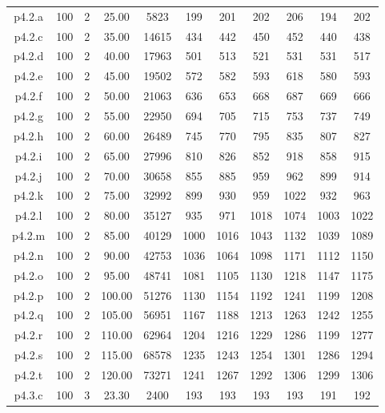 \begin{center}
\begin{tabular}{ |c|c|c|c|c|c|c|c|c|c|c| }
p4.2.a & 100 & 2 & 25.00 & 5823 & 199 & 201 & 202 & 206 & 194 & 202  \\
p4.2.c & 100 & 2 & 35.00 & 14615 & 434 & 442 & 450 & 452 & 440 & 438  \\
p4.2.d & 100 & 2 & 40.00 & 17963 & 501 & 513 & 521 & 531 & 531 & 517  \\
p4.2.e & 100 & 2 & 45.00 & 19502 & 572 & 582 & 593 & 618 & 580 & 593  \\
p4.2.f & 100 & 2 & 50.00 & 21063 & 636 & 653 & 668 & 687 & 669 & 666  \\
p4.2.g & 100 & 2 & 55.00 & 22950 & 694 & 705 & 715 & 753 & 737 & 749  \\
p4.2.h & 100 & 2 & 60.00 & 26489 & 745 & 770 & 795 & 835 & 807 & 827  \\
p4.2.i & 100 & 2 & 65.00 & 27996 & 810 & 826 & 852 & 918 & 858 & 915  \\
p4.2.j & 100 & 2 & 70.00 & 30658 & 855 & 885 & 959 & 962 & 899 & 914  \\
p4.2.k & 100 & 2 & 75.00 & 32992 & 899 & 930 & 959 & 1022 & 932 & 963  \\
p4.2.l & 100 & 2 & 80.00 & 35127 & 935 & 971 & 1018 & 1074 & 1003 & 1022  \\
p4.2.m & 100 & 2 & 85.00 & 40129 & 1000 & 1016 & 1043 & 1132 & 1039 & 1089  \\
p4.2.n & 100 & 2 & 90.00 & 42753 & 1036 & 1064 & 1098 & 1171 & 1112 & 1150  \\
p4.2.o & 100 & 2 & 95.00 & 48741 & 1081 & 1105 & 1130 & 1218 & 1147 & 1175  \\
p4.2.p & 100 & 2 & 100.00 & 51276 & 1130 & 1154 & 1192 & 1241 & 1199 & 1208  \\
p4.2.q & 100 & 2 & 105.00 & 56951 & 1167 & 1188 & 1213 & 1263 & 1242 & 1255  \\
p4.2.r & 100 & 2 & 110.00 & 62964 & 1204 & 1216 & 1229 & 1286 & 1199 & 1277  \\
p4.2.s & 100 & 2 & 115.00 & 68578 & 1235 & 1243 & 1254 & 1301 & 1286 & 1294  \\
p4.2.t & 100 & 2 & 120.00 & 73271 & 1241 & 1267 & 1292 & 1306 & 1299 & 1306  \\
p4.3.c & 100 & 3 & 23.30 & 2400 & 193 & 193 & 193 & 193 & 191 & 192  \\
\hline
\end{tabular}
\end{center}

